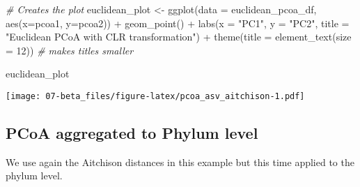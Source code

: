 \documentclass[
  oneside]{book}
\newenvironment{Shaded}{\begin{snugshade}}{\end{snugshade}}
\newcommand{\AttributeTok}[1]{\textcolor[rgb]{0.77,0.63,0.00}{#1}}
\newcommand{\CommentTok}[1]{\textcolor[rgb]{0.56,0.35,0.01}{\textit{#1}}}
\newcommand{\DecValTok}[1]{\textcolor[rgb]{0.00,0.00,0.81}{#1}}
\newcommand{\FunctionTok}[1]{\textcolor[rgb]{0.00,0.00,0.00}{#1}}
\newcommand{\NormalTok}[1]{#1}
\newcommand{\OtherTok}[1]{\textcolor[rgb]{0.56,0.35,0.01}{#1}}
\newcommand{\SpecialCharTok}[1]{\textcolor[rgb]{0.00,0.00,0.00}{#1}}
\newcommand{\StringTok}[1]{\textcolor[rgb]{0.31,0.60,0.02}{#1}}
\begin{document}
\begin{Shaded}
\begin{Highlighting}[]
\CommentTok{\# Creates the plot}
\NormalTok{euclidean\_plot }\OtherTok{\textless{}{-}} \FunctionTok{ggplot}\NormalTok{(}\AttributeTok{data =}\NormalTok{ euclidean\_pcoa\_df, }\FunctionTok{aes}\NormalTok{(}\AttributeTok{x=}\NormalTok{pcoa1, }\AttributeTok{y=}\NormalTok{pcoa2)) }\SpecialCharTok{+}
  \FunctionTok{geom\_point}\NormalTok{() }\SpecialCharTok{+}
  \FunctionTok{labs}\NormalTok{(}\AttributeTok{x =} \StringTok{"PC1"}\NormalTok{,}
       \AttributeTok{y =} \StringTok{"PC2"}\NormalTok{,}
       \AttributeTok{title =} \StringTok{"Euclidean PCoA with CLR transformation"}\NormalTok{) }\SpecialCharTok{+}
  \FunctionTok{theme}\NormalTok{(}\AttributeTok{title =} \FunctionTok{element\_text}\NormalTok{(}\AttributeTok{size =} \DecValTok{12}\NormalTok{)) }\CommentTok{\# makes titles smaller}

\NormalTok{euclidean\_plot}
\end{Highlighting}
\end{Shaded}

\texttt{[image: 07-beta\_files/figure-latex/pcoa\_asv\_aitchison-1.pdf]}

\hypertarget{pcoa-aggregated-to-phylum-level}{%
\subsection{PCoA aggregated to Phylum level}\label{pcoa-aggregated-to-phylum-level}}

We use again the Aitchison distances in this example but this time applied to the phylum level.
\end{document}
